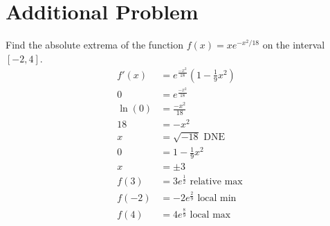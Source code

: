 \documentclass{article}
\begin{document}
\section{Additional Problem}
Find the absolute extrema of the function \(f(x)= xe^{- x^2/18}\) on the interval \([-2,4]\). 
$$\begin{align}
	f'(x)&=e^{\frac{-x^2}{18}}(1-\frac{1}{9}x^2)\\
	0&=e^{\frac{-x^2}{18}}\\
	\ln(0)&=\frac{-x^2}{18}\\
	18&=-x^2\\
	x&=\sqrt{-18} \text{ DNE}\\
	0&=1-\frac{1}{9}x^2\\
	x&=\pm 3\\
	f(3)&=3e^{\frac{1}{2}} \text{ relative max}\\
	f(-2)&=-2e^{\frac{2}{9}} \text{ local min}\\
	f(4)&=4e^{\frac{8}{9}} \text{ local max}
\end{align}$$

%
\end{document}
